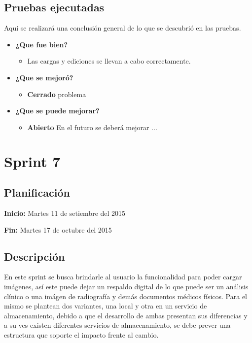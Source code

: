 \documentclass[a4paper,12pt]{article}
\begin{document}
\subsection{Pruebas ejecutadas}
Aqui se realizará una conclusión general de lo que se descubrió en las pruebas.
	\begin{itemize}
		\item \textbf{¿Que fue bien?}
        	\begin{itemize}
				\item        Las cargas y ediciones se llevan a cabo correctamente.
			\end{itemize}

   		\item \textbf{¿Que se mejoró?}
        	\begin{itemize}
                \item \textbf{Cerrado} problema
			\end{itemize}

   		\item \textbf{¿Que se puede mejorar?}
        	\begin{itemize}
		        \item \textbf{Abierto} En el futuro se deberá mejorar ...
            \end{itemize}
        

	\end{itemize}
\clearpage



\section{Sprint 7} %

\subsection{Planificación}

\textbf{Inicio: }Martes 11 de setiembre del 2015 

\textbf{Fin:} Martes 17 de octubre del 2015



\subsection{Descripción}

En este sprint se busca brindarle al usuario la funcionalidad para poder cargar imágenes, así este puede dejar un respaldo digital de lo que puede ser un análisis clínico o una imágen de radiografía y demás documentos médicos físicos. Para el mismo se plantean dos variantes, una local y otra en un servicio de almacenamiento, debido a que el desarrollo de ambas presentan sus diferencias y a su ves existen diferentes servicios de almacenamiento, se debe prever una estructura que soporte el impacto frente al cambio.
\end{document}
